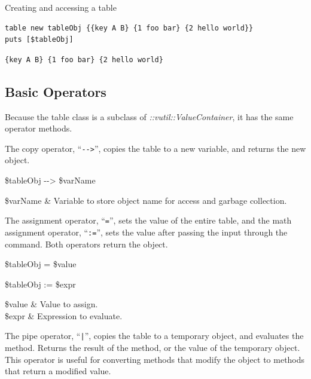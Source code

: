 \begin{example}{Creating and accessing a table}
\begin{lstlisting}
table new tableObj {{key A B} {1 foo bar} {2 hello world}}
puts [$tableObj]
\end{lstlisting}
\tcblower
\begin{lstlisting}
{key A B} {1 foo bar} {2 hello world}
\end{lstlisting}
\end{example}


\clearpage

\subsection{Basic Operators}
Because the table class is a subclass of \textit{::vutil::ValueContainer}, it has the same operator methods. 

The copy operator, ``\texttt{-{}->}'', copies the table to a new variable, and returns the new object.
\begin{syntax}
 \$tableObj -{}-> \$varName
\end{syntax} 
\begin{args}
\$varName & Variable to store object name for access and garbage collection. 
\end{args}

The assignment operator, ``\texttt{=}'', sets the value of the entire table, and the math assignment operator, ``\texttt{:=}'', sets the value after passing the input through the  command. 
Both operators return the object.

\begin{syntax}
 \$tableObj = \$value
\end{syntax}
\begin{syntax}
 \$tableObj := \$expr
\end{syntax}

\begin{args}
\$value & Value to assign. \\
\$expr & Expression to evaluate.
\end{args}

The pipe operator, ``\texttt{|}'', copies the table to a temporary object, and evaluates the method.
Returns the result of the method, or the value of the temporary object.
This operator is useful for converting methods that modify the object to methods that return a modified value.

